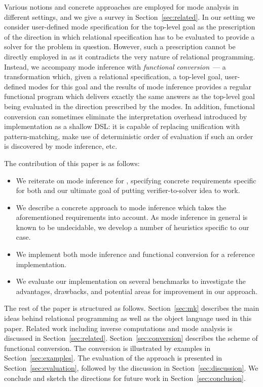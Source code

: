 Various notions and concrete approaches are employed for mode analysis in different settings, and we give a survey in Section~\ref{sec:related}.
In our setting we consider user-defined mode specification for the top-level goal as the prescription of the direction in which relational specification has to be evaluated to provide a solver for the problem in question.
However, such a prescription cannot be directly employed in \mk as it contradicts the very nature of relational programming.
Instead, we accompany mode inference with \emph{functional conversion}~--- a transformation which, given a relational specification, a top-level goal, user-defined modes for this goal and the results of mode inference provides a regular functional program which delivers exactly the same answers as the top-level goal being evaluated in the direction prescribed by the modes.
In addition, functional conversion can sometimes eliminate the interpretation overhead introduced by \mk implementation as a shallow DSL: it is capable of replacing unification with pattern-matching, make use of deterministic order of evaluation if such an order is discovered by mode inference, etc.


The contribution of this paper is as follows:

\begin{itemize}
\item We reiterate on mode inference for \mk, specifying concrete requirements specific for both \mk and our ultimate goal of putting verifier-to-solver idea to work.
\item We describe a concrete approach to mode inference which takes the aforementioned requirements into account. As mode inference in general is known to be undecidable, we develop a number of heuristics specific to our case.
\item We implement both mode inference and functional conversion for a reference \mk implementation.
\item We evaluate our implementation on several benchmarks to investigate the advantages, drawbacks, and potential areas for improvement in our approach.
\end{itemize}

The rest of the paper is structured as follows.
Section~\ref{sec:mk} describes the main ideas behind relational programming as well as the object language used in this paper.
Related work including inverse computations and mode analysis is discussed in Section~\ref{sec:related}.
Section~\ref{sec:conversion} describes the scheme of functional conversion.
The conversion is illustrated by examples in Section~\ref{sec:examples}.
The evaluation of the approach is presented in Section~\ref{sec:evaluation}, followed by the discussion in Section~\ref{sec:discussion}.
We conclude and sketch the directions for future work in Section~\ref{sec:conclusion}.
